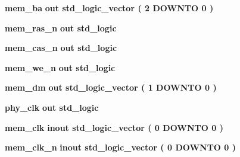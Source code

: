 \begin{DoxyCompactItemize}
\item 
{\bf mem\+\_\+ba}  {\bfseries {\bfseries \textcolor{keywordflow}{out}\textcolor{vhdlchar}{ }}} {\bfseries \textcolor{comment}{std\+\_\+logic\+\_\+vector}\textcolor{vhdlchar}{ }\textcolor{vhdlchar}{(}\textcolor{vhdlchar}{ }\textcolor{vhdlchar}{ } \textcolor{vhdldigit}{2} \textcolor{vhdlchar}{ }\textcolor{keywordflow}{D\+O\+W\+N\+TO}\textcolor{vhdlchar}{ }\textcolor{vhdlchar}{ } \textcolor{vhdldigit}{0} \textcolor{vhdlchar}{ }\textcolor{vhdlchar}{)}\textcolor{vhdlchar}{ }} 
\item 
{\bf mem\+\_\+ras\+\_\+n}  {\bfseries {\bfseries \textcolor{keywordflow}{out}\textcolor{vhdlchar}{ }}} {\bfseries \textcolor{comment}{std\+\_\+logic}\textcolor{vhdlchar}{ }} 
\item 
{\bf mem\+\_\+cas\+\_\+n}  {\bfseries {\bfseries \textcolor{keywordflow}{out}\textcolor{vhdlchar}{ }}} {\bfseries \textcolor{comment}{std\+\_\+logic}\textcolor{vhdlchar}{ }} 
\item 
{\bf mem\+\_\+we\+\_\+n}  {\bfseries {\bfseries \textcolor{keywordflow}{out}\textcolor{vhdlchar}{ }}} {\bfseries \textcolor{comment}{std\+\_\+logic}\textcolor{vhdlchar}{ }} 
\item 
{\bf mem\+\_\+dm}  {\bfseries {\bfseries \textcolor{keywordflow}{out}\textcolor{vhdlchar}{ }}} {\bfseries \textcolor{comment}{std\+\_\+logic\+\_\+vector}\textcolor{vhdlchar}{ }\textcolor{vhdlchar}{(}\textcolor{vhdlchar}{ }\textcolor{vhdlchar}{ } \textcolor{vhdldigit}{1} \textcolor{vhdlchar}{ }\textcolor{keywordflow}{D\+O\+W\+N\+TO}\textcolor{vhdlchar}{ }\textcolor{vhdlchar}{ } \textcolor{vhdldigit}{0} \textcolor{vhdlchar}{ }\textcolor{vhdlchar}{)}\textcolor{vhdlchar}{ }} 
\item 
{\bf phy\+\_\+clk}  {\bfseries {\bfseries \textcolor{keywordflow}{out}\textcolor{vhdlchar}{ }}} {\bfseries \textcolor{comment}{std\+\_\+logic}\textcolor{vhdlchar}{ }} 
\item 
{\bf mem\+\_\+clk}  {\bfseries {\bfseries \textcolor{keywordflow}{inout}\textcolor{vhdlchar}{ }}} {\bfseries \textcolor{comment}{std\+\_\+logic\+\_\+vector}\textcolor{vhdlchar}{ }\textcolor{vhdlchar}{(}\textcolor{vhdlchar}{ }\textcolor{vhdlchar}{ } \textcolor{vhdldigit}{0} \textcolor{vhdlchar}{ }\textcolor{keywordflow}{D\+O\+W\+N\+TO}\textcolor{vhdlchar}{ }\textcolor{vhdlchar}{ } \textcolor{vhdldigit}{0} \textcolor{vhdlchar}{ }\textcolor{vhdlchar}{)}\textcolor{vhdlchar}{ }} 
\item 
{\bf mem\+\_\+clk\+\_\+n}  {\bfseries {\bfseries \textcolor{keywordflow}{inout}\textcolor{vhdlchar}{ }}} {\bfseries \textcolor{comment}{std\+\_\+logic\+\_\+vector}\textcolor{vhdlchar}{ }\textcolor{vhdlchar}{(}\textcolor{vhdlchar}{ }\textcolor{vhdlchar}{ } \textcolor{vhdldigit}{0} \textcolor{vhdlchar}{ }\textcolor{keywordflow}{D\+O\+W\+N\+TO}\textcolor{vhdlchar}{ }\textcolor{vhdlchar}{ } \textcolor{vhdldigit}{0} \textcolor{vhdlchar}{ }\textcolor{vhdlchar}{)}\textcolor{vhdlchar}{ }} 

\end{DoxyCompactItemize}
